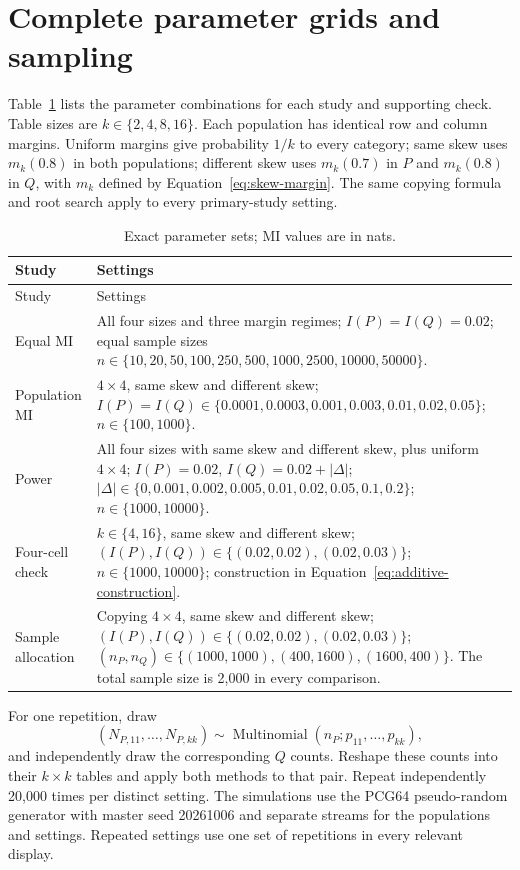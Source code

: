 \section{Complete parameter grids and sampling}

Table~\ref{tab:exact-grids} lists the parameter combinations for each study
and supporting check.
Table sizes are \(k\in\{2,4,8,16\}\). Each population has identical
row and column margins. Uniform margins give probability \(1/k\) to
every category; same skew uses \(m_k(0.8)\) in both populations; different
skew uses \(m_k(0.7)\) in \(P\) and \(m_k(0.8)\) in \(Q\), with
\(m_k\) defined by Equation~\eqref{eq:skew-margin}. The same copying
formula and root search apply to every primary-study setting.

\begin{longtable}{@{}>{\raggedright\arraybackslash}p{}>{\raggedright\arraybackslash}p{}@{}}
\caption{Exact parameter sets; MI values are in nats.}\label{tab:exact-grids}\\
\toprule Study & Settings\\\midrule\endfirsthead
\toprule Study & Settings\\\midrule\endhead
Equal MI & All four sizes and three margin regimes;
\(I(P)=I(Q)=0.02\); equal sample sizes
\(n\in\{10,20,50,100,250,500,1000,2500,10000,50000\}\).\\
Population MI & \(4\times4\), same skew and different skew;
\(I(P)=I(Q)\in\{0.0001,0.0003,0.001,0.003,0.01,0.02,0.05\}\);
\(n\in\{100,1000\}\).\\
Power & All four sizes with same skew and different skew, plus uniform
\(4\times4\); \(I(P)=0.02\), \(I(Q)=0.02+|\Delta|\);
\(|\Delta|\in\{0,0.001,0.002,0.005,0.01,0.02,0.05,0.1,0.2\}\);
\(n\in\{1000,10000\}\).\\
Four-cell check & \(k\in\{4,16\}\), same skew and different skew;
\((I(P),I(Q))\in\{(0.02,0.02),(0.02,0.03)\}\);
\(n\in\{1000,10000\}\); construction in
Equation~\eqref{eq:additive-construction}.\\
Sample allocation & Copying \(4\times4\), same skew and different skew;
\((I(P),I(Q))\in\{(0.02,0.02),(0.02,0.03)\}\);
\((n_P,n_Q)\in\{(1000,1000),(400,1600),(1600,400)\}\).
The total sample size is 2,000 in every comparison.\\
\bottomrule
\end{longtable}

For one repetition, draw
\begin{equation}
 (N_{P,11},\ldots,N_{P,kk})\sim\operatorname{Multinomial}
      (n_P;p_{11},\ldots,p_{kk}),
\end{equation}
and independently draw the corresponding \(Q\) counts.
Reshape these counts into their \(k\times k\) tables and apply both
methods to that pair. Repeat independently 20,000 times per distinct
setting. The simulations use the PCG64 pseudo-random generator with master
seed 20261006 and separate streams for the populations and settings.
Repeated settings use one set of repetitions in every relevant display.

